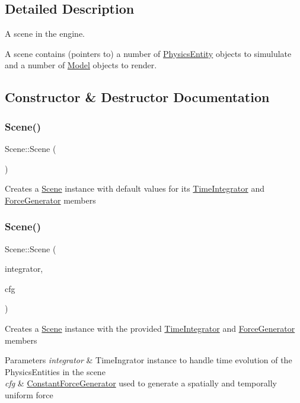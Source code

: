 \subsection{Detailed Description}
A scene in the engine. 

A scene contains (pointers to) a number of \hyperlink{classPhysicsEntity}{Physics\+Entity} objects to simululate and a number of \hyperlink{classModel}{Model} objects to render. 

\subsection{Constructor \& Destructor Documentation}
\mbox{\label{classScene_ad10176d75a9cc0da56626f682d083507}} 
\subsubsection{\texorpdfstring{Scene()}{Scene()}\hspace{0.1cm}{\footnotesize\ttfamily [1/2]}}
{\footnotesize\ttfamily Scene\+::\+Scene (\begin{DoxyParamCaption}{ }\end{DoxyParamCaption})}

Creates a \hyperlink{classScene}{Scene} instance with default values for its \hyperlink{classTimeIntegrator}{Time\+Integrator} and \hyperlink{classForceGenerator}{Force\+Generator} members \mbox{\label{classScene_a0a3d0bcafa5f18639e2af91c4c43115b}} 
\subsubsection{\texorpdfstring{Scene()}{Scene()}\hspace{0.1cm}{\footnotesize\ttfamily [2/2]}}
{\footnotesize\ttfamily Scene\+::\+Scene (\begin{DoxyParamCaption}\item[{std\+::shared\+\_\+ptr$<$ \hyperlink{classTimeIntegrator}{Time\+Integrator} $>$}]{integrator,  }\item[{\hyperlink{classConstantForceGenerator}{Constant\+Force\+Generator}}]{cfg }\end{DoxyParamCaption})}

Creates a \hyperlink{classScene}{Scene} instance with the provided \hyperlink{classTimeIntegrator}{Time\+Integrator} and \hyperlink{classForceGenerator}{Force\+Generator} members 
\begin{DoxyParams}{Parameters}
{\em integrator} & Time\+Ingrator instance to handle time evolution of the Physics\+Entities in the scene \\
\hline
{\em cfg} & \hyperlink{classConstantForceGenerator}{Constant\+Force\+Generator} used to generate a spatially and temporally uniform force \\
\hline
\end{DoxyParams}


